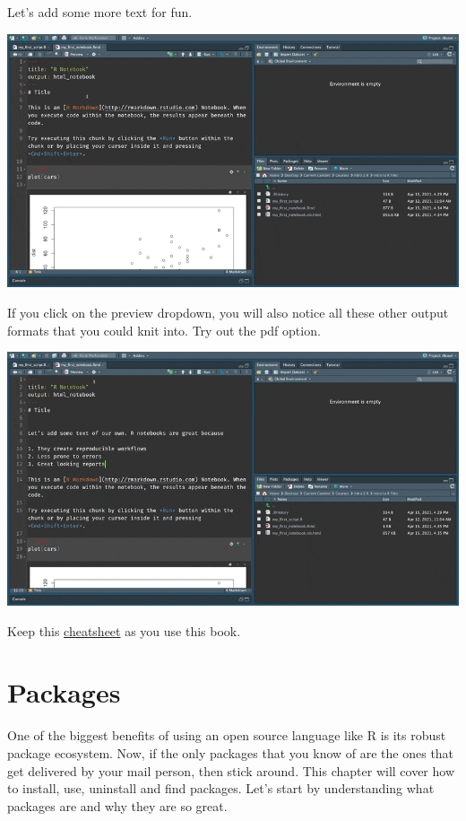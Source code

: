 \documentclass[
]{book}
\begin{document}
Let's add some more text for fun.

\includegraphics{assets/ch_2-notebooks/gifs/text_fun.gif}

If you click on the preview dropdown, you will also notice all these other output formats that you could knit into. Try out the pdf option.

\includegraphics{assets/ch_2-notebooks/gifs/pdf_doc.gif}

Keep this \href{https://www.rstudio.com/wp-content/uploads/2015/03/rmarkdown-reference.pdf}{cheatsheet} as you use this book.

\hypertarget{packages}{%
\chapter{Packages}\label{packages}}

One of the biggest benefits of using an open source language like R is its robust package ecosystem. Now, if the only packages that you know of are the ones that get delivered by your mail person, then stick around. This chapter will cover how to install, use, uninstall and find packages. Let's start by understanding what packages are and why they are so great.
\end{document}
